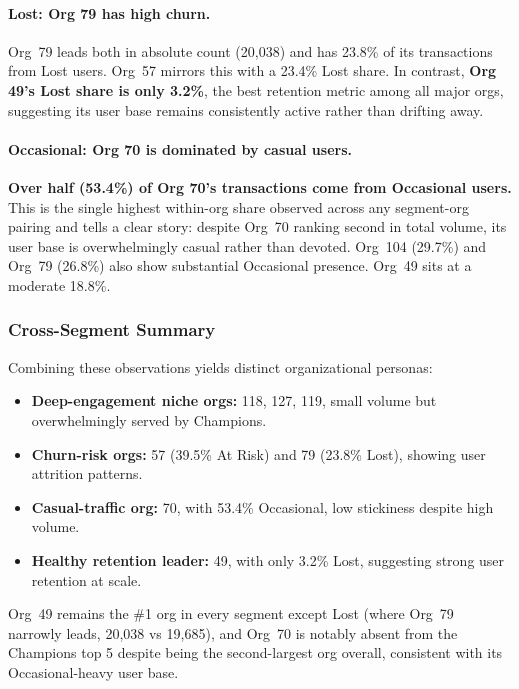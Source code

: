 \documentclass[11pt,a4paper]{article}
\begin{document}
\paragraph{Lost: Org 79 has high churn.}
Org~79 leads both in absolute count (20{,}038) and has 23.8\% of its transactions from Lost users. Org~57 mirrors this with a 23.4\% Lost share. In contrast, \textbf{Org 49's Lost share is only 3.2\%}, the best retention metric among all major orgs, suggesting its user base remains consistently active rather than drifting away.

\paragraph{Occasional: Org 70 is dominated by casual users.}
\textbf{Over half (53.4\%) of Org 70's transactions come from Occasional users.} This is the single highest within-org share observed across any segment-org pairing and tells a clear story: despite Org~70 ranking second in total volume, its user base is overwhelmingly casual rather than devoted. Org~104 (29.7\%) and Org~79 (26.8\%) also show substantial Occasional presence. Org~49 sits at a moderate 18.8\%.

\subsubsection{Cross-Segment Summary}

Combining these observations yields distinct organizational personas:
\begin{itemize}
    \item \textbf{Deep-engagement niche orgs:} 118, 127, 119, small volume but overwhelmingly served by Champions.
    \item \textbf{Churn-risk orgs:} 57 (39.5\% At Risk) and 79 (23.8\% Lost), showing user attrition patterns.
    \item \textbf{Casual-traffic org:} 70, with 53.4\% Occasional, low stickiness despite high volume.
    \item \textbf{Healthy retention leader:} 49, with only 3.2\% Lost, suggesting strong user retention at scale.
\end{itemize}

Org~49 remains the \#1 org in every segment except Lost (where Org~79 narrowly leads, 20{,}038 vs 19{,}685), and Org~70 is notably absent from the Champions top 5 despite being the second-largest org overall, consistent with its Occasional-heavy user base.
\end{document}
